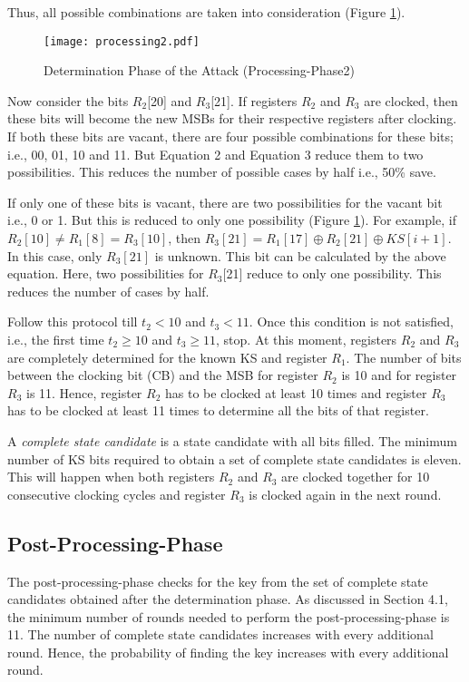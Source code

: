 \documentclass{llncs}
\begin{document}
Thus, all possible combinations are taken into consideration (Figure \ref{processing2}).
\begin{figure}[!htb]
\begin{center}
\hspace*{-3cm}
\texttt{[image: processing2.pdf]}
\caption{Determination Phase of the Attack (Processing-Phase2)}
\label{processing2}
\end{center}
\end{figure}

Now consider the bits $R_{2}$[20] and $R_{3}$[21]. If registers $R_{2}$ and $R_{3}$ are clocked, then these bits will become the new MSBs for their respective registers after clocking. If both these bits are vacant, there are four possible combinations for these bits; i.e., 00, 01, 10 and 11. But Equation 2 and Equation 3 reduce them to two possibilities. This reduces the number of possible cases by half i.e., 50\% save.

If only one of these bits is vacant, there are two possibilities for the vacant bit i.e., 0 or 1. But this is reduced to only one possibility (Figure \ref{processing2}). For example, if $R_{2}[10] \neq R_{1}[8] = R_{3}[10]$,  then $R_{3}[21] = R_{1}[17] \oplus R_{2}[21] \oplus KS[i+1]$. In this case, only $R_{3}[21]$ is unknown. This bit can be calculated by the above equation. Here, two possibilities for $R_{3}$[21] reduce to only one possibility. This reduces the number of cases by half.

Follow this protocol till $t_2 < 10$ and $t_3 < 11$. Once this condition is not satisfied, i.e., the first time $t_2 \geq 10$ and $t_3 \geq 11$, stop. At this moment, registers $R_{2}$ and $R_{3}$ are completely determined for the known KS and register $R_{1}$. The number of bits between the clocking bit (CB) and the MSB for register $R_{2}$ is 10 and for register $R_{3}$ is 11. Hence, register $R_{2}$ has to be clocked at least 10 times and register $R_{3}$ has to be clocked at least 11 times to determine all the bits of that register.

A \emph{complete state candidate} is a state candidate with all bits filled. The minimum number of KS bits required to obtain a set of complete state candidates is eleven. This will happen when both registers $R_{2}$ and $R_{3}$ are clocked together for 10 consecutive clocking cycles and register $R_{3}$ is clocked again in the next round.


\subsection{Post-Processing-Phase}
The post-processing-phase checks for the key from the set of complete state candidates obtained after the determination phase. As discussed in Section 4.1, the minimum number of rounds needed to perform the post-processing-phase is 11. The number of complete state candidates increases with every additional round. Hence, the probability of finding the key increases with every additional round.
\end{document}
